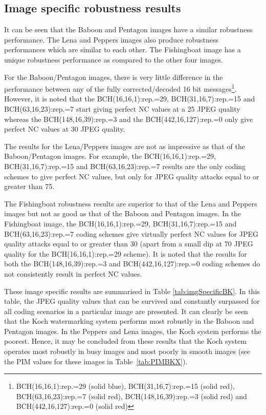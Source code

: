 \documentclass[12pt]{report}
\begin{document}
\subsection{Image specific robustness results}
It can be seen that the Baboon and Pentagon images have a
similar robustness performance. The  Lena and Peppers images also produce robustness
performances which are similar to each other. The Fishingboat image has a unique robustness performance as
compared to the other four images.

For the Baboon/Pentagon images, there is very little
difference in the performance between any of the 
fully corrected/decoded 16 bit messages\footnote{BCH(16,16,1):rep.=29 (solid blue), BCH(31,16,7):rep.=15 (solid red), \\
BCH(63,16,23):rep.=7 (solid red), BCH(148,16,39):rep.=3  (solid red) and \\
BCH(442,16,127):rep.=0 (solid red)}.
However, it is noted that the 
BCH(16,16,1):rep.=29, BCH(31,16,7):rep.=15 and BCH(63,16,23):rep.=7 start giving
perfect NC values at a 25 JPEG quality whereas the BCH(148,16,39):rep.=3 and the
BCH(442,16,127):rep.=0 only give perfect NC values at 30 JPEG quality.

The results for the Lena/Peppers images are not as impressive as that of the Baboon/Pentagon images.
For example, the BCH(16,16,1):rep.=29, BCH(31,16,7):rep.=15 and BCH(63,16,23):rep.=7
results are the only coding schemes to give perfect NC values,
but only for JPEG quality attacks equal to or greater than 75. 

The Fishingboat robustness results are superior to that of the Lena and Peppers images but not as good
as that of the Baboon and Pentagon images. 
In the Fishingboat image, the BCH(16,16,1):rep.=29, BCH(31,16,7):rep.=15 and BCH(63,16,23):rep.=7
coding schemes give virtually perfect NC values 
for JPEG quality attacks equal to or greater than 30 (apart from a 
small dip at 70 JPEG quality for the BCH(16,16,1):rep.=29 scheme). 
It is noted that the results for both the
BCH(148,16,39):rep.=3 and BCH(442,16,127):rep.=0 
coding schemes 
do not consistently result in perfect NC values.

These image specific results are summarised in Table \ref{tab:imgSpecificBK}. In this table,
the JPEG quality values that can be survived and constantly surpassed for all coding scenarios in a particular
image are presented. It can clearly be seen that the Koch watermarking system performs most robustly in the Baboon
and Pentagon images. In the Peppers and Lena images, the Koch system performs the poorest.
Hence, it may be concluded from these results that the Koch system operates most robustly in
busy images and most poorly in smooth images (see the PIM values for these images in Table~\ref{tab:PIMBKX}).
\end{document}
